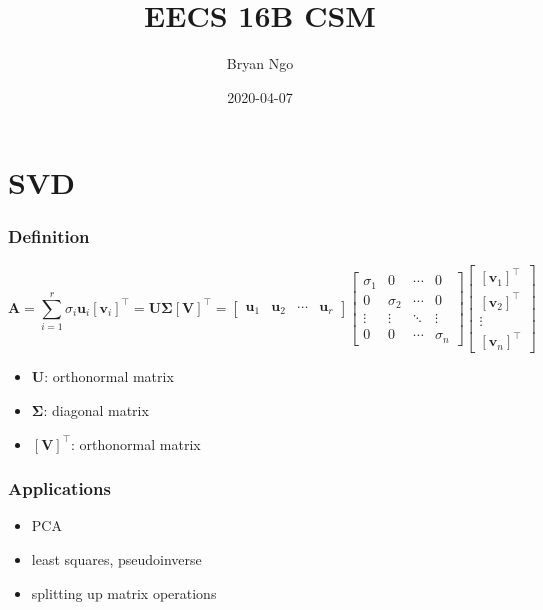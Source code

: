 \documentclass[aspectratio=169]{beamer}
\title{EECS 16B CSM}
\author{Bryan Ngo}
\date{2020-04-07}
\institute{UC Berkeley}
\newcommand{\tpose}[1]{\left[#1\right]^{\! \top} \!\!}
\begin{document}
\begin{frame}
    \maketitle
\end{frame}

\section{SVD}

\begin{frame}
    \frametitle{Definition}

    \begin{equation}
        \bm{A} = \sum_{i = 1}^r \sigma_i \bm{u}_i \tpose{\bm{v}_i} = \bm{U \Sigma} \tpose{\bm{V}} =
        \begin{bmatrix}
            \bm{u}_1 & \bm{u}_2 & \cdots & \bm{u}_r
        \end{bmatrix}
        \begin{bmatrix}
            \sigma_1 & 0 & \cdots & 0 \\
            0 & \sigma_2 & \cdots & 0 \\
            \vdots & \vdots & \ddots & \vdots \\
            0 & 0 & \cdots & \sigma_n
        \end{bmatrix}
        \begin{bmatrix}
            \tpose{\bm{v}_1} \\
            \tpose{\bm{v}_2} \\
            \vdots \\
            \tpose{\bm{v}_n}
        \end{bmatrix}
    \end{equation}
    \begin{itemize}
        \item \(\bm{U}\): orthonormal matrix
        \item \(\bm{\Sigma}\): diagonal matrix
        \item \(\tpose{\bm{V}}\): orthonormal matrix
    \end{itemize}
\end{frame}

\begin{frame}
    \frametitle{Applications}

    \begin{itemize}
        \item PCA
        \item least squares, pseudoinverse
        \item splitting up matrix operations
    \end{itemize}
\end{frame}
\end{document}
